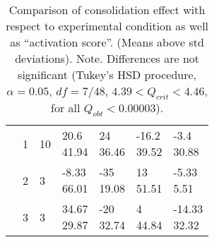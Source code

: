 \begin{table*}
\begin{tabularx}{\textwidth}{XXXXXXX}
      & 1
      & 10
      & \cellcontent{20.6\\41.94}
      & \cellcontent{24\\36.46}
      & \cellcontent{-16.2\\39.52}
      & \cellcontent{-3.4\\30.88}
      \\

      & 2
      & 3
      & \cellcontent{-8.33\\66.01}
      & \cellcontent{-35\\19.08}
      & \cellcontent{13\\51.51}
      & \cellcontent{-5.33\\5.51}
      \\

      & 3
      & 3
      & \cellcontent{34.67\\29.87}
      & \cellcontent{-20\\32.74}
      & \cellcontent{4\\44.84}
      & \cellcontent{-14.33\\32.32}
      \\

      \bottomrule
    \end{tabularx}
    \endgroup
  \caption{Comparison of consolidation effect with respect to
    experimental condition as well as ``activation score''. (Means
    above std deviations). Note. Differences are not significant
    (Tukey's HSD procedure, $\alpha=0.05$, $df = 7/48$,  $4.39 <
    Q_{crit} < 4.46$, for all $Q_{obt}<0.00003$).}
  \label{tab:activation}
\end{table*}



